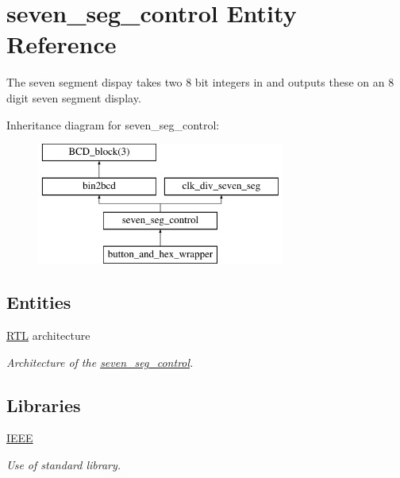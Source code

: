 \hypertarget{classseven__seg__control}{\section{seven\-\_\-seg\-\_\-control Entity Reference}
\label{classseven__seg__control}
}


The seven segment dispay takes two 8 bit integers in and outputs these on an 8 digit seven segment display.  


Inheritance diagram for seven\-\_\-seg\-\_\-control\-:\begin{figure}[H]
\begin{center}
\leavevmode
\includegraphics[height=4.000000cm]{classseven__seg__control}
\end{center}
\end{figure}
\subsection*{Entities}
\begin{DoxyCompactItemize}
\item 
\hyperlink{classseven__seg__control_1_1RTL}{R\-T\-L} architecture
\begin{DoxyCompactList}\small\item\em Architecture of the \hyperlink{classseven__seg__control}{seven\-\_\-seg\-\_\-control}. \end{DoxyCompactList}\end{DoxyCompactItemize}
\subsection*{Libraries}
 \begin{DoxyCompactItemize}
\item 
\hypertarget{classseven__seg__control_ae4f03c286607f3181e16b9aa12d0c6d4}{\hyperlink{classseven__seg__control_ae4f03c286607f3181e16b9aa12d0c6d4}{I\-E\-E\-E} }\label{classseven__seg__control_ae4f03c286607f3181e16b9aa12d0c6d4}

\begin{DoxyCompactList}\small\item\em Use of standard library. \end{DoxyCompactList}\end{DoxyCompactItemize}
